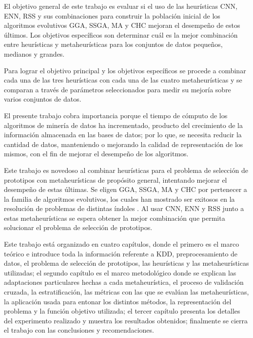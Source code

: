 
El objetivo general de este trabajo es evaluar si el uso de las heurísticas CNN, ENN, RSS y sus combinaciones para construir la población inicial de los algoritmos evolutivos GGA, SSGA, MA y CHC  mejoran el desempeño de estos últimos. Los objetivos específicos son determinar cuál es la mejor combinación entre heurísticas y metaheurísticas para los conjuntos de datos pequeños, medianos y grandes.

Para lograr el objetivo principal y los objetivos específicos se procede a combinar cada una de las tres heurísticas con cada una de las cuatro metaheurísticas y se comparan a través de parámetros seleccionados para medir su mejoría sobre varios conjuntos de datos. 

El presente trabajo cobra importancia porque el tiempo de cómputo de los algoritmos de minería de datos ha incrementado, producto del crecimiento de la información almacenada en las bases de datos; por lo que, se necesita reducir la cantidad de datos, manteniendo o mejorando la calidad de representación de los mismos, con el fin de mejorar el desempeño de los algoritmos.

Este trabajo es novedoso al combinar heurísticas para el problema de selección de prototipos con metaheurísticas de propósito general, intentando mejorar el desempeño de estas últimas. Se eligen GGA, SSGA, MA y CHC por pertenecer a la familia de algoritmos evolutivos, los cuales han mostrado ser exitosos en la resolución de problemas de distintas índoles \cite{han2011data}. Al usar CNN, ENN y RSS junto a estas metaheurísticas se espera obtener la mejor combinación que permita solucionar el problema de selección de prototipos.

Este trabajo está organizado en cuatro capítulos, donde el primero es el marco teórico e introduce toda la información referente a KDD, preprocesamiento de datos, el problema de selección de prototipos, las heurísticas y las metaheurísticas utilizadas; el segundo capítulo es el marco metodológico donde se explican las adaptaciones particulares hechas a cada metaheurística, el proceso de validación cruzada, la estratificación, las métricas con las que se evalúan las metaheurísticas, la aplicación usada para entonar los distintos métodos, la representación del problema y la función objetivo utilizada; el tercer capítulo presenta los detalles del experimento realizado y muestra los resultados obtenidos; finalmente se cierra el trabajo con las conclusiones y recomendaciones.